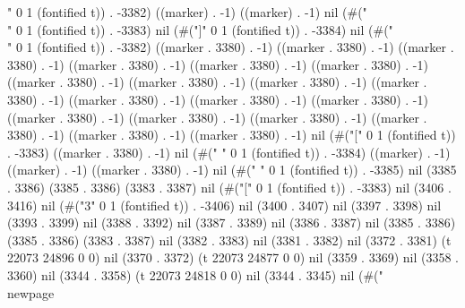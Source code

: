 " 0 1 (fontified t)) . -3382) ((marker) . -1) ((marker) . -1) nil (#("\\" 0 1 (fontified t)) . -3383) nil (#("]" 0 1 (fontified t)) . -3384) nil (#("\\" 0 1 (fontified t)) . -3382) ((marker . 3380) . -1) ((marker . 3380) . -1) ((marker . 3380) . -1) ((marker . 3380) . -1) ((marker . 3380) . -1) ((marker . 3380) . -1) ((marker . 3380) . -1) ((marker . 3380) . -1) ((marker . 3380) . -1) ((marker . 3380) . -1) ((marker . 3380) . -1) ((marker . 3380) . -1) ((marker . 3380) . -1) ((marker . 3380) . -1) ((marker . 3380) . -1) ((marker . 3380) . -1) ((marker . 3380) . -1) ((marker . 3380) . -1) ((marker . 3380) . -1) nil (#("[" 0 1 (fontified t)) . -3383) ((marker . 3380) . -1) nil (#("
" 0 1 (fontified t)) . -3384) ((marker) . -1) ((marker) . -1) ((marker . 3380) . -1) nil (#(" " 0 1 (fontified t)) . -3385) nil (3385 . 3386) (3385 . 3386) (3383 . 3387) nil (#("[" 0 1 (fontified t)) . -3383) nil (3406 . 3416) nil (#("3" 0 1 (fontified t)) . -3406) nil (3400 . 3407) nil (3397 . 3398) nil (3393 . 3399) nil (3388 . 3392) nil (3387 . 3389) nil (3386 . 3387) nil (3385 . 3386) (3385 . 3386) (3383 . 3387) nil (3382 . 3383) nil (3381 . 3382) nil (3372 . 3381) (t 22073 24896 0 0) nil (3370 . 3372) (t 22073 24877 0 0) nil (3359 . 3369) nil (3358 . 3360) nil (3344 . 3358) (t 22073 24818 0 0) nil (3344 . 3345) nil (#("
\\newpage

